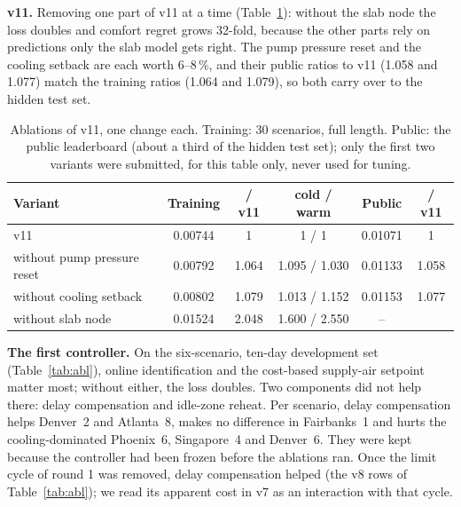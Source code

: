 \documentclass{article}
\begin{document}
\textbf{v11.} Removing one part of v11 at a time (Table~\ref{tab:abl11}): without the slab node the loss doubles and
comfort regret grows 32-fold, because the other parts rely on predictions only the slab model gets right. The pump
pressure reset and the cooling setback are each worth 6--8\,\%, and their public ratios to v11 (1.058 and 1.077) match
the training ratios (1.064 and 1.079), so both carry over to the hidden test set.
\begin{table}[h]\centering
\caption{Ablations of v11, one change each. Training: 30 scenarios, full length. Public: the public leaderboard
(about a third of the hidden test set); only the first two variants were submitted, for this table only, never used for tuning.}\label{tab:abl11}
\small
\begin{tabular}{lccccc}\toprule
Variant & Training & / v11 & cold / warm & Public & / v11\\\midrule
v11 & 0.00744 & 1 & 1 / 1 & 0.01071 & 1\\
without pump pressure reset & 0.00792 & 1.064 & 1.095 / 1.030 & 0.01133 & 1.058\\
without cooling setback & 0.00802 & 1.079 & 1.013 / 1.152 & 0.01153 & 1.077\\
without slab node & 0.01524 & 2.048 & 1.600 / 2.550 & -- & \\\bottomrule
\end{tabular}
\end{table}
\textbf{The first controller.}
On the six-scenario, ten-day development set (Table~\ref{tab:abl}), online identification and the cost-based
supply-air setpoint matter most; without either, the loss doubles. Two components did not help there: delay
compensation and idle-zone reheat. Per scenario, delay compensation helps Denver~2 and Atlanta~8, makes no difference
in Fairbanks~1 and hurts the cooling-dominated Phoenix~6, Singapore~4 and Denver~6. They were kept because the
controller had been frozen before the ablations ran. Once the limit cycle of round 1 was removed, delay compensation
helped (the v8 rows of Table~\ref{tab:abl}); we read its apparent cost in v7 as an interaction with that cycle.
\end{document}
